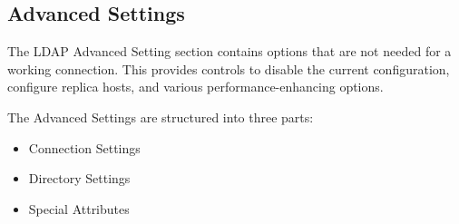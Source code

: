 \documentclass[letterpaper,10pt,english]{sphinxmanual}
\begin{document}
\subsection{Advanced Settings}
\label{configuration_user/user_auth_ldap:advanced-settings}
The LDAP Advanced Setting section contains options that are not needed for a
working connection. This provides controls to disable the current
configuration,
configure replica hosts, and various performance-enhancing options.

The Advanced Settings are structured into three parts:
\begin{itemize}
\item {} 
Connection Settings

\item {} 
Directory Settings

\item {} 
Special Attributes

\end{itemize}
\end{document}

